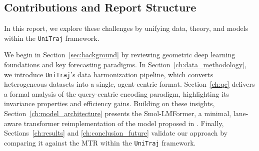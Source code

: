 \subsection{Contributions and Report Structure}
In this report, we explore these challenges by unifying data, theory, and models within the \texttt{UniTraj} framework.

We begin in Section~\ref{sec:background} by reviewing geometric deep learning foundations and key forecasting paradigms. In Section~\ref{ch:data_methodology}, we introduce \texttt{UniTraj}'s data harmonization pipeline, which converts heterogeneous datasets into a single, agent-centric format. Section~\ref{ch:qc} delivers a formal analysis of the query-centric encoding paradigm, highlighting its invariance properties and efficiency gains. Building on these insights, Section~\ref{ch:model_architecture} presents the Smol-LMFormer, a minimal, lane-aware transformer reimplementation of the model proposed in \cite{lmformerYadav2025}. Finally, Sections~\ref{ch:results} and \ref{ch:conclusion_future} validate our approach by comparing it against the MTR within the \texttt{UniTraj} framework.
